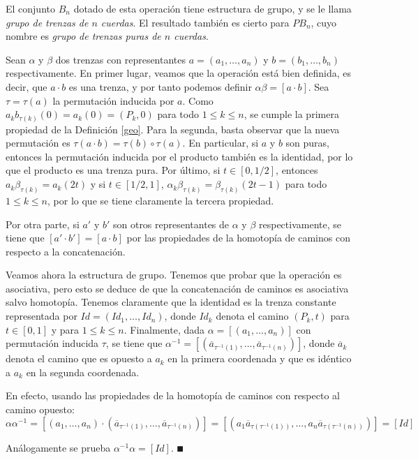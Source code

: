 \documentclass[TFG.tex]{subfiles}
\begin{document}
\begin{prop}
El conjunto $B_n$ dotado de esta operación tiene estructura de grupo, y se le llama \emph{grupo de trenzas de $n$ cuerdas}. El resultado también es cierto para $PB_n$, cuyo nombre es \emph{grupo de trenzas puras de $n$ cuerdas}. 
\end{prop}

\begin{dem}
Sean $\alpha$ y $\beta$ dos trenzas con representantes $a=(a_1,\dots, a_n)$ y $b=(b_1,\dots, b_n)$ respectivamente. En primer lugar, veamos que la operación está bien definida, es decir, que $a\cdot b$ es una trenza, y por tanto podemos definir $\alpha\beta=[a\cdot b]$. Sea $\tau=\tau(a)$ la permutación inducida por $a$. Como $a_kb_{\tau(k)}(0)=a_k(0)=(P_k,0)$ para todo $1\leq k\leq n$, se cumple la primera propiedad de la Definición \ref{geo}. Para la segunda, basta observar que la nueva permutación es $\tau(a\cdot b)=\tau(b)\circ \tau(a)$. En particular, si $a$ y $b$ son puras, entonces la permutación inducida por el producto también es la identidad, por lo que el producto es una trenza pura. Por último, si $t\in[0,1/2]$, entonces $a_k\beta_{\tau(k)}=a_k(2t)$ y si $t\in [1/2,1]$, $\alpha_k\beta_{\tau(k)}=\beta_{\tau(k)}(2t-1)$ para todo $1\leq k\leq n$, por lo que se tiene claramente la tercera propiedad. 

Por otra parte, si $a'$ y $b'$ son otros representantes de $\alpha$ y $\beta$ respectivamente, se tiene que $[a'\cdot b']=[a\cdot b]$ por las propiedades de la homotopía de caminos con respecto a la concatenación.

Veamos ahora la estructura de grupo. Tenemos que probar que la operación es asociativa, pero esto se deduce de que la concatenación de caminos es asociativa salvo homotopía.
Tenemos claramente que la identidad es la trenza constante representada por $Id=(Id_1,\dots, Id_n)$, donde $Id_k$ denota el camino $(P_k, t)$ para $t\in[0,1]$ y para $1\leq k\leq n$.
Finalmente, dada $\alpha=[(a_1,\dots, a_n)]$ con permutación inducida $\tau$, se tiene que $\alpha^{-1}=[(\overline{a}_{\tau^{-1}(1)},\dots, \overline{a}_{\tau^{-1}(n)})]$, donde $\overline{a}_k$ denota el camino que es opuesto a $a_k$ en la primera coordenada y que es idéntico a $a_k$ en la segunda coordenada. 

En efecto, usando las propiedades de la homotopía de caminos con respecto al camino opuesto:
\[
\alpha\alpha^{-1}=[(a_1,\dots, a_n)\cdot (\overline{a}_{\tau^{-1}(1)},\dots, \overline{a}_{\tau^{-1}(n)})]=[(a_1\overline{a}_{\tau(\tau^{-1}(1))},\dots, a_n\overline{a}_{\tau(\tau^{-1}(n))})]=[Id]
\]

Análogamente se prueba $\alpha^{-1}\alpha=[Id]$. 
$\QED$
\end{dem}
\end{document}
